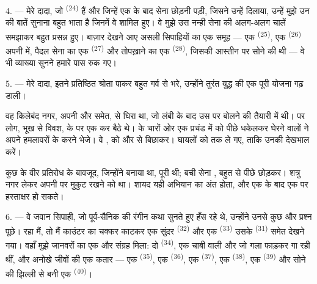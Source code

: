 \VUsaut{4.0mm}
\VUsaut{2.8mm}

4. --- मेरे दादा, जो  \textsuperscript{(24)} हैं और
जिन्हें एक  के बाद सेना छोड़नी पड़ी, जिसने उन्हें
 दिलाया, उन्हें मुझे उन  की बातें सुनाना बहुत
भाता है जिनमें वे शामिल हुए। वे मुझे उस नन्ही सेना की अलग-अलग चालें समझाकर बहुत
प्रसन्न हुए। बाज़ार देखने आए असली सिपाहियों का एक समूह — एक
 \textsuperscript{(25)}, एक 
\textsuperscript{(26)} अपनी  में, पैदल सेना का एक
 \textsuperscript{(27)} और तोपख़ाने का एक 
\textsuperscript{(28)}, जिसकी आस्तीन पर सोने की  थी — वे भी
व्याख्या सुनने हमारे पास रुक गए।

5. --- मेरे दादा, इतने प्रतिष्ठित श्रोता पाकर बहुत गर्व से भरे, उन्होंने तुरंत
युद्ध की एक पूरी योजना गढ़ डाली।

वह किलेबंद नगर, अपनी  और  समेत,
 से घिरा था, जो लंबी  के बाद उस पर
 बोलने की तैयारी में थी। पर  लोग, भूख से विवश,
 के  पर एक  कर बैठे थे।
 के चारों ओर एक प्रचंड  में  को
पीछे धकेलकर  घेरने वालों ने अपने 
 हमलावरों के  करने भेजे। वे ,
 को  और  से बिछाकर।
 घायलों को  तक ले गए, ताकि
 उनकी देखभाल करें।

कुछ  के वीर प्रतिरोध के बावजूद, जिन्होंने 
बनाया था,  पूरी थी; बची सेना , बहुत से
 पीछे छोड़कर। शत्रु नगर लेकर अपनी  पर मुकुट रखने को था।
शायद यही अभियान का अंत होता, और एक  के बाद एक
 पर हस्ताक्षर हो सकते।

\VUsaut{4.4mm}
\VUsaut{2.8mm}

6. --- वे जवान सिपाही, जो पूर्व-सैनिक की रंगीन कथा सुनते हुए हँस रहे थे, उन्होंने
उनसे कुछ और प्रश्न पूछे। रहा मैं, तो मैं काउंटर का चक्कर काटकर एक सुंदर
 \textsuperscript{(32)} और एक  \textsuperscript{(33)}
उसके  \textsuperscript{(31)} समेत देखने गया। वहाँ मुझे जानवरों का एक और
संग्रह मिला: दो  \textsuperscript{(34)}, एक चाबी वाली
 और  जो गला फाड़कर गा रही थीं, और अनोखे जीवों की एक
कतार — एक  \textsuperscript{(35)}, एक 
\textsuperscript{(36)}, एक  \textsuperscript{(37)}, एक 
\textsuperscript{(38)}, एक  \textsuperscript{(39)} और सोने की झिल्ली
से बनी एक  \textsuperscript{(40)}।


